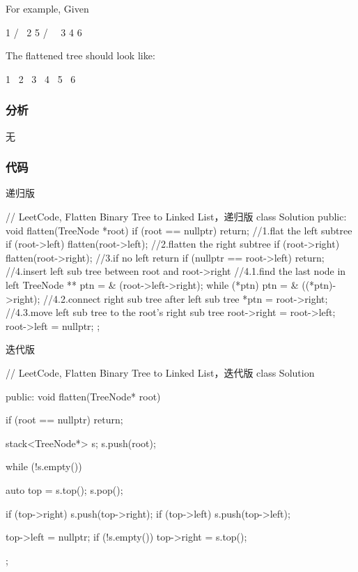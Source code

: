 For example, Given
\begin{Code}
         1
        / \
       2   5
      / \   \
     3   4   6
\end{Code}

The flattened tree should look like:
\begin{Code}
   1
    \
     2
      \
       3
        \
         4
          \
           5
            \
             6
\end{Code}

\subsubsection{分析}
无


\subsubsection{代码}
递归版
\begin{Code}
// LeetCode, Flatten Binary Tree to Linked List，递归版
class Solution {
public:
    void flatten(TreeNode *root) {
        if (root == nullptr) return;
        //1.flat the left subtree
        if (root->left)
            flatten(root->left);
        //2.flatten the right subtree
        if (root->right)
            flatten(root->right);
        //3.if no left return
        if (nullptr == root->left)
            return;
        //4.insert left sub tree between root and root->right
        //4.1.find the last node in left
        TreeNode ** ptn = & (root->left->right);
        while (*ptn)
            ptn = & ((*ptn)->right);
        //4.2.connect right sub tree after left sub tree
        *ptn = root->right;
        //4.3.move left sub tree to the root's right sub tree
        root->right = root->left;
        root->left = nullptr;
    }
};
\end{Code}

迭代版
\begin{Code}
// LeetCode, Flatten Binary Tree to Linked List，迭代版
class Solution {
public:
    void flatten(TreeNode* root) {
        if (root == nullptr)
            return;

        stack<TreeNode*> s;
        s.push(root);

        while (!s.empty()) {
            auto top = s.top();
            s.pop();

            if (top->right)
                s.push(top->right);
            if (top->left)
                s.push(top->left);

            top->left = nullptr;
            if (!s.empty())
                top->right = s.top();
        }
    }
};
\end{Code}



